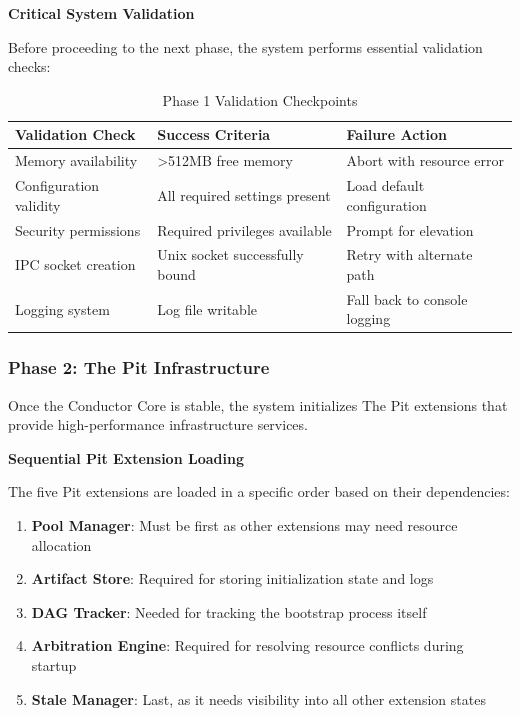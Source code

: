 \textbf{Critical System Validation}

Before proceeding to the next phase, the system performs essential validation checks:

\begin{table}[h]
\centering
\caption{Phase 1 Validation Checkpoints}
\label{tab:phase1-validation}
\begin{tabular}{@{}lll@{}}
\toprule
\textbf{Validation Check} & \textbf{Success Criteria} & \textbf{Failure Action} \\
\midrule
Memory availability & >512MB free memory & Abort with resource error \\
Configuration validity & All required settings present & Load default configuration \\
Security permissions & Required privileges available & Prompt for elevation \\
IPC socket creation & Unix socket successfully bound & Retry with alternate path \\
Logging system & Log file writable & Fall back to console logging \\
\bottomrule
\end{tabular}
\end{table}

\subsubsection{Phase 2: The Pit Infrastructure}

Once the Conductor Core is stable, the system initializes The Pit extensions that provide high-performance infrastructure services.

\textbf{Sequential Pit Extension Loading}

The five Pit extensions are loaded in a specific order based on their dependencies:

\begin{enumerate}
    \item \textbf{Pool Manager}: Must be first as other extensions may need resource allocation
    \item \textbf{Artifact Store}: Required for storing initialization state and logs
    \item \textbf{DAG Tracker}: Needed for tracking the bootstrap process itself
    \item \textbf{Arbitration Engine}: Required for resolving resource conflicts during startup
    \item \textbf{Stale Manager}: Last, as it needs visibility into all other extension states
\end{enumerate}


